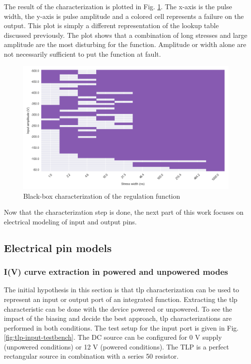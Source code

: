 The result of the characterization is plotted in Fig. \ref{fig:cz-black-box}.
The x-axis is the pulse width, the y-axis is pulse amplitude and a colored cell represents a failure on the output.
This plot is simply a different representation of the lookup table discussed previously.
The plot shows that a combination of long stresses and large amplitude are the most disturbing for the function.
Amplitude or width alone are not necessarily sufficient to put the function at fault.

\begin{figure}[!h]
  \centering
  \includegraphics[width=\textwidth]{src/4/figures/black_box_regulator.png}
  \caption{Black-box characterization of the regulation function}
  \label{fig:cz-black-box}
\end{figure}

Now that the characterization step is done, the next part of this work focuses on electrical modeling of input and output pins.

\subsection{Electrical pin models}
\subsubsection{I(V) curve extraction in powered and unpowered modes}

The initial hypothesis in this section is that \gls{tlp} characterization can be used to represent an input or output port of an integrated function.
Extracting the \gls{tlp} characteristic can be done with the device powered or unpowered.
To see the impact of the biasing and decide the best approach, \gls{tlp} characterizations are performed in both conditions.
The test setup for the input port is given in Fig. \ref{fig:tlp-input-testbench}.
The DC source can be configured for 0 V supply (unpowered conditions) or 12 V (powered conditions).
The TLP is a perfect rectangular source in combination with a series 50 \textOmega{} resistor.

